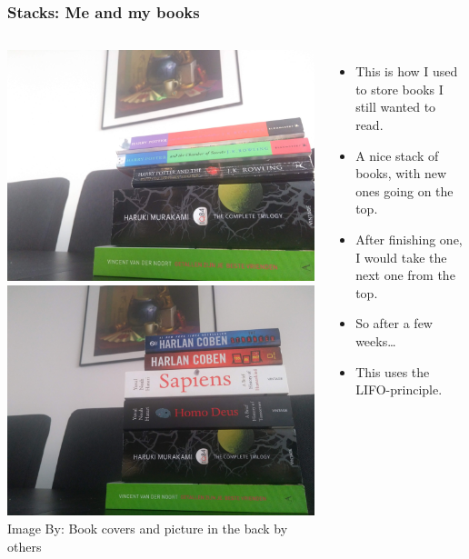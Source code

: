 \begin{frame}
	\frametitle{Stacks: Me and my books}

	\begin{columns}[T]
			\begin{center}

					\includegraphics[width=0.7\linewidth]{images/stack_read.jpg}\\

					\includegraphics[width=0.7\linewidth]{images/stack_unread.jpg}\\

{\scriptsize Image By:}
{\scriptsize Book covers and picture in the back by others}
			\end{center}
		\begin{itemize}
			\item This is how I used to store books I still wanted to read.
			\item A nice \alert{stack} of books, with new ones going on the top.
			\item After finishing one, I would take the next one from the top.
			\item So after a few weeks\dots
			\item This uses the \alert{LIFO}-principle.
		\end{itemize}
	\end{columns}
\end{frame}

